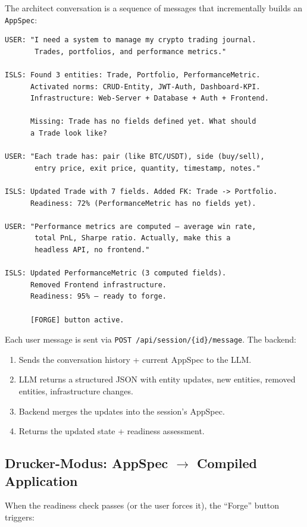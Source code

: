 \documentclass[11pt,a4paper]{article}
\begin{document}
The architect conversation is a sequence of messages that 
incrementally builds an \texttt{AppSpec}:

\begin{lstlisting}[style=bash]
USER: "I need a system to manage my crypto trading journal.
       Trades, portfolios, and performance metrics."

ISLS: Found 3 entities: Trade, Portfolio, PerformanceMetric.
      Activated norms: CRUD-Entity, JWT-Auth, Dashboard-KPI.
      Infrastructure: Web-Server + Database + Auth + Frontend.
      
      Missing: Trade has no fields defined yet. What should
      a Trade look like?

USER: "Each trade has: pair (like BTC/USDT), side (buy/sell), 
       entry price, exit price, quantity, timestamp, notes."

ISLS: Updated Trade with 7 fields. Added FK: Trade -> Portfolio.
      Readiness: 72% (PerformanceMetric has no fields yet).

USER: "Performance metrics are computed — average win rate, 
       total PnL, Sharpe ratio. Actually, make this a 
       headless API, no frontend."

ISLS: Updated PerformanceMetric (3 computed fields).
      Removed Frontend infrastructure.
      Readiness: 95% — ready to forge.
      
      [FORGE] button active.
\end{lstlisting}

Each user message is sent via \texttt{POST /api/session/\{id\}/message}.
The backend:
\begin{enumerate}[nosep]
\item Sends the conversation history + current AppSpec to the LLM.
\item LLM returns a structured JSON with entity updates, new 
      entities, removed entities, infrastructure changes.
\item Backend merges the updates into the session's AppSpec.
\item Returns the updated state + readiness assessment.
\end{enumerate}

\subsection{Drucker-Modus: AppSpec $\to$ Compiled Application}

When the readiness check passes (or the user forces it), the 
``Forge'' button triggers:
\end{document}
